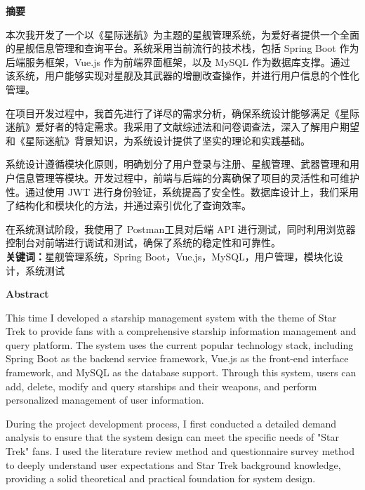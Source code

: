 \documentclass{base}
\begin{document}
\cover
\newpage
\tableofcontents

\newpage


	\begin{center}
	\textbf{摘要}
\end{center}


本次我开发了一个以《星际迷航》为主题的星舰管理系统，为爱好者提供一个全面的星舰信息管理和查询平台。系统采用当前流行的技术栈，包括 Spring Boot 作为后端服务框架，Vue.js 作为前端界面框架，以及 MySQL 作为数据库支撑。通过该系统，用户能够实现对星舰及其武器的增删改查操作，并进行用户信息的个性化管理。

在项目开发过程中，我首先进行了详尽的需求分析，确保系统设计能够满足《星际迷航》爱好者的特定需求。我采用了文献综述法和问卷调查法，深入了解用户期望和《星际迷航》背景知识，为系统设计提供了坚实的理论和实践基础。

系统设计遵循模块化原则，明确划分了用户登录与注册、星舰管理、武器管理和用户信息管理等模块。开发过程中，前端与后端的分离确保了项目的灵活性和可维护性。通过使用 JWT 进行身份验证，系统提高了安全性。数据库设计上，我们采用了结构化和模块化的方法，并通过索引优化了查询效率。

在系统测试阶段，我使用了 Postman工具对后端 API 进行测试，同时利用浏览器控制台对前端进行调试和测试，确保了系统的稳定性和可靠性。
\\

\noindent\textbf{关键词：}星舰管理系统，Spring Boot，Vue.js，MySQL，用户管理，模块化设计，系统测试

\newpage


\begin{center}
	\textbf{Abstract}
\end{center}
\qquad This time I developed a starship management system with the theme of Star Trek to provide fans with a comprehensive starship information management and query platform. The system uses the current popular technology stack, including Spring Boot as the backend service framework, Vue.js as the front-end interface framework, and MySQL as the database support. Through this system, users can add, delete, modify and query starships and their weapons, and perform personalized management of user information.

During the project development process, I first conducted a detailed demand analysis to ensure that the system design can meet the specific needs of "Star Trek" fans. I used the literature review method and questionnaire survey method to deeply understand user expectations and Star Trek background knowledge, providing a solid theoretical and practical foundation for system design.
\end{document}
